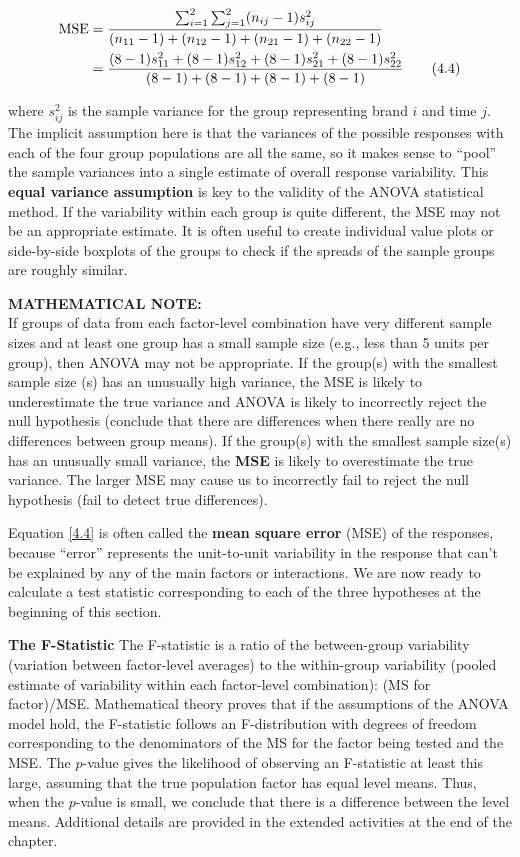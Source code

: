 \documentclass[
]{report}
\begin{document}
\begin{align}\label{4.4}
\text{MSE} &= 
\frac{\sum_{i=1}^{2}\sum_{j=1}^{2}(n_{ij} - 1)s_{ij}^2}{(n_{11} - 1) + (n_{12} - 1) + (n_{21} - 1) + (n_{22} - 1)} \notag \\
&= \frac{(8 - 1)s_{11}^2 + (8 - 1)s_{12}^2 + (8 - 1)s_{21}^2 + (8 - 1)s_{22}^2}
{(8 - 1) + (8 - 1) + (8 - 1) + (8 - 1)}
\tag{4.4}
\end{align}

where \(s_{ij}^2\) is the sample variance for the group representing brand \(i\) and time \(j\). The implicit assumption here is that the variances of the possible responses with each of the four group populations are all the same, so it makes sense to ``pool'' the sample variances into a single estimate of overall response variability. This \textbf{equal variance assumption} is key to the validity of the ANOVA statistical method. If the variability within each group is quite different, the MSE may not be an appropriate estimate. It is often useful to create individual value plots or side-by-side boxplots of the groups to check if the spreads of the sample groups are roughly similar.

\large

\textbf{MATHEMATICAL NOTE:}\\
If groups of data from each factor-level combination have very different sample sizes and at least one group has a small sample size (e.g., less than 5 units per group), then ANOVA may not be appropriate. If the group(s) with the smallest sample size (s) has an unusually high variance, the MSE is likely to underestimate the true variance and ANOVA is likely to incorrectly reject the null hypothesis (conclude that there are differences when there really are no differences between group means). If the group(s) with the smallest sample size(s) has an unusually small variance, the \textbf{MSE} is likely to overestimate the true variance. The larger MSE may cause us to incorrectly fail to reject the null hypothesis (fail to detect true differences).
\normalsize

Equation \ref{4.4} is often called the \textbf{mean square error} (MSE) of the responses, because ``error'' represents the unit-to-unit variability in the response that can't be explained by any of the main factors or interactions. We are now ready to calculate a test statistic corresponding to each of the three hypotheses at the beginning of this section.

\textbf{The F-Statistic} The F-statistic is a ratio of the between-group variability (variation between factor-level averages) to the within-group variability (pooled estimate of variability within each factor-level combination): (MS for factor)/MSE. Mathematical theory proves that if the assumptions of the ANOVA model hold, the F-statistic follows an F-distribution with degrees of freedom corresponding to the denominators of the MS for the factor being tested and the MSE. The \(p\)-value gives the likelihood of observing an F-statistic at least this large, assuming that the true population factor has equal level means. Thus, when the \(p\)-value is small, we conclude that there is a difference between the level means. Additional details are provided in the extended activities at the end of the chapter.
\end{document}
